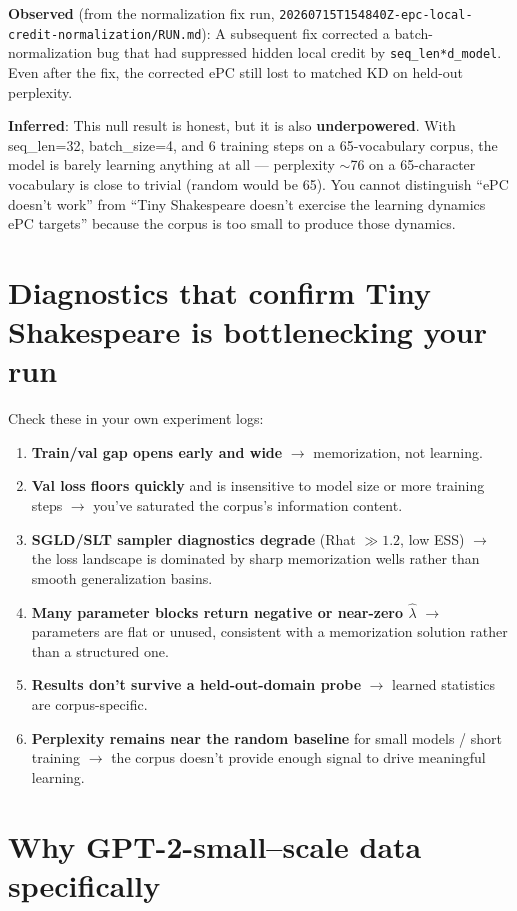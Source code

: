 \documentclass[11pt]{article}
\begin{document}
\textbf{Observed} (from the normalization fix run, \texttt{20260715T154840Z-epc-local-credit-normalization/RUN.md}): A subsequent fix corrected a batch-normalization bug that had suppressed hidden local credit by \texttt{seq\_len*d\_model}. Even after the fix, the corrected ePC still lost to matched KD on held-out perplexity.

\textbf{Inferred}: This null result is honest, but it is also \textbf{underpowered}. With seq\_len=32, batch\_size=4, and 6 training steps on a 65-vocabulary corpus, the model is barely learning anything at all --- perplexity $\sim$76 on a 65-character vocabulary is close to trivial (random would be 65). You cannot distinguish ``ePC doesn't work'' from ``Tiny Shakespeare doesn't exercise the learning dynamics ePC targets'' because the corpus is too small to produce those dynamics.

\section{Diagnostics that confirm Tiny Shakespeare is bottlenecking your run}

Check these in your own experiment logs:

\begin{enumerate}[leftmargin=*]
\item \textbf{Train/val gap opens early and wide} $\to$ memorization, not learning.
\item \textbf{Val loss floors quickly} and is insensitive to model size or more training steps $\to$ you've saturated the corpus's information content.
\item \textbf{SGLD/SLT sampler diagnostics degrade} (Rhat $\gg 1.2$, low ESS) $\to$ the loss landscape is dominated by sharp memorization wells rather than smooth generalization basins.
\item \textbf{Many parameter blocks return negative or near-zero $\hat\lambda$} $\to$ parameters are flat or unused, consistent with a memorization solution rather than a structured one.
\item \textbf{Results don't survive a held-out-domain probe} $\to$ learned statistics are corpus-specific.
\item \textbf{Perplexity remains near the random baseline} for small models / short training $\to$ the corpus doesn't provide enough signal to drive meaningful learning.
\end{enumerate}

\section{Why GPT-2-small--scale data specifically}
\end{document}
